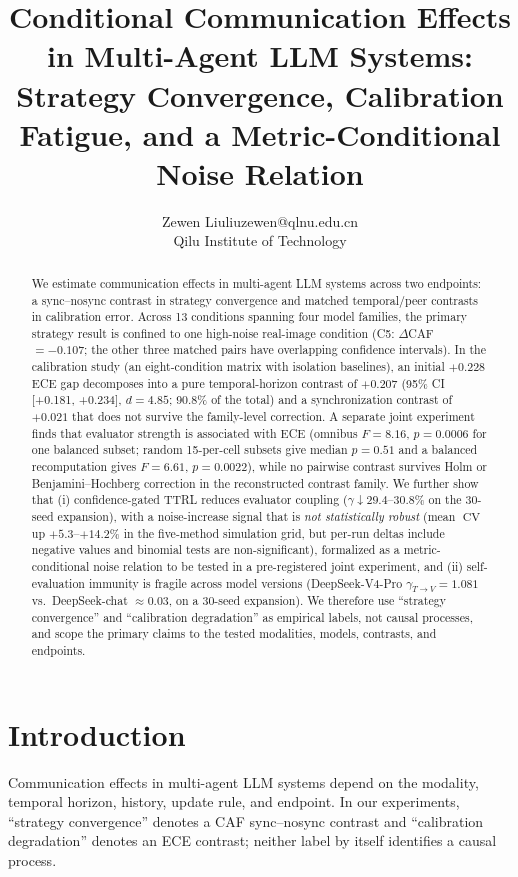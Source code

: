 \documentclass[11pt]{article}
\title{Conditional Communication Effects in Multi-Agent LLM Systems: Strategy Convergence, Calibration Fatigue, and a Metric-Conditional Noise Relation}
\author{\name Zewen Liu\email liuzewen@qlnu.edu.cn\\\addr Qilu Institute of Technology}  %
\date{}
\DeclareMathOperator{\CV}{CV}
\begin{document}
\maketitle

\begin{abstract}
We estimate communication effects in multi-agent LLM systems across two endpoints: a sync--nosync contrast in strategy convergence and matched temporal/peer contrasts in calibration error. Across 13 conditions spanning four model families, the primary strategy result is confined to one high-noise real-image condition (C5: $\Delta$CAF $=-0.107$; the other three matched pairs have overlapping confidence intervals). In the calibration study (an eight-condition matrix with isolation baselines), an initial $+0.228$ ECE gap decomposes into a pure temporal-horizon contrast of $+0.207$ (95\% CI [+0.181, +0.234], $d{=}4.85$; 90.8\% of the total) and a synchronization contrast of $+0.021$ that does not survive the family-level correction. A separate joint experiment finds that evaluator strength is associated with ECE (omnibus $F{=}8.16$, $p{=}0.0006$ for one balanced subset; random 15-per-cell subsets give median $p{=}0.51$ and a balanced recomputation gives $F{=}6.61$, $p{=}0.0022$), while no pairwise contrast survives Holm or Benjamini--Hochberg correction in the reconstructed contrast family. We further show that (i) confidence-gated TTRL reduces evaluator coupling ($\gamma \downarrow 29.4$--$30.8\%$ on the 30-seed expansion), with a noise-increase signal that is \emph{not statistically robust} (mean $\CV$ up $+5.3$--$+14.2\%$ in the five-method simulation grid, but per-run deltas include negative values and binomial tests are non-significant), formalized as a metric-conditional noise relation to be tested in a pre-registered joint experiment, and (ii) self-evaluation immunity is fragile across model versions (DeepSeek-V4-Pro $\gamma_{T\to V}{=}1.081$ vs.\ DeepSeek-chat $\approx 0.03$, on a 30-seed expansion). We therefore use ``strategy convergence'' and ``calibration degradation'' as empirical labels, not causal processes, and scope the primary claims to the tested modalities, models, contrasts, and endpoints.
\end{abstract}

\section{Introduction}

Communication effects in multi-agent LLM systems depend on the modality, temporal horizon, history, update rule, and endpoint. In our experiments, ``strategy convergence'' denotes a CAF sync--nosync contrast and ``calibration degradation'' denotes an ECE contrast; neither label by itself identifies a causal process.
\end{document}
